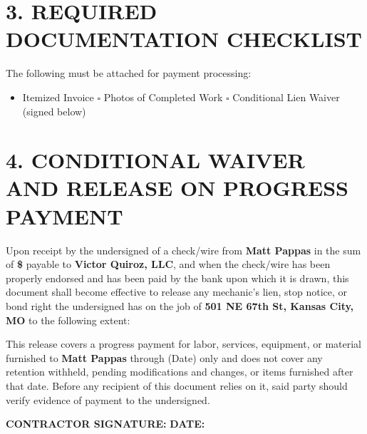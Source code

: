 \documentclass[10pt,letterpaper]{article}
\begin{document}
\section*{3. REQUIRED DOCUMENTATION CHECKLIST}
\vspace{-0.5em}
{\footnotesize The following must be attached for payment processing:}
\begin{itemize}[noitemsep,topsep=0pt,leftmargin=1.5em]
\item[$\square$] Itemized Invoice \hfill $\square$ Photos of Completed Work \hfill $\square$ Conditional Lien Waiver (signed below)
\end{itemize}

\section*{4. CONDITIONAL WAIVER AND RELEASE ON PROGRESS PAYMENT}
\vspace{-0.5em}
{\footnotesize
Upon receipt by the undersigned of a check/wire from \textbf{Matt Pappas} in the sum of \textbf{\$\underline{\hspace{2cm}}} payable to \textbf{Victor Quiroz, LLC}, and when the check/wire has been properly endorsed and has been paid by the bank upon which it is drawn, this document shall become effective to release any mechanic's lien, stop notice, or bond right the undersigned has on the job of \textbf{501 NE 67th St, Kansas City, MO} to the following extent:

This release covers a progress payment for labor, services, equipment, or material furnished to \textbf{Matt Pappas} through \textbf{\underline{\hspace{2cm}}} (Date) only and does not cover any retention withheld, pending modifications and changes, or items furnished after that date. Before any recipient of this document relies on it, said party should verify evidence of payment to the undersigned.
}

\vspace{1em}


\vspace{1.5em}

\noindent\textbf{CONTRACTOR SIGNATURE:} \underline{\hspace{5cm}} \hspace{0.5cm} \textbf{DATE:} \underline{\hspace{2cm}}
\end{document}
